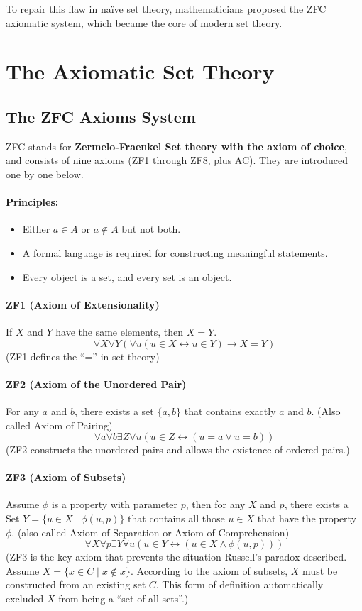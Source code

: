 To repair this flaw in naïve set theory, mathematicians proposed the ZFC axiomatic system, which became the core of modern set theory.

\section{The Axiomatic Set Theory}

\subsection{The ZFC Axioms System}
ZFC stands for \textbf{Zermelo-Fraenkel Set theory with the axiom of choice}, and consists of nine axioms (ZF1 through ZF8, plus AC). They are introduced one by one below.

\paragraph{Principles:}
\begin{itemize}
    \item Either $a \in A$ or $a \notin A$ but not both.
    \item A formal language is required for constructing meaningful statements.
    \item Every object is a set, and every set is an object.
\end{itemize}

\paragraph{ZF1 (Axiom of Extensionality)}
If $X$ and $Y$ have the same elements, then $X = Y$.
$$ \forall X \forall Y (\forall u (u \in X \leftrightarrow u \in Y) \to X = Y) $$
(ZF1 defines the “=” in set theory)

\paragraph{ZF2 (Axiom of the Unordered Pair)}
For any $a$ and $b$, there exists a set $\{a,b\}$ that contains exactly $a$ and $b$. (Also called Axiom of Pairing)
$$ \forall a \forall b \exists Z \forall u (u \in Z \leftrightarrow (u = a \vee u = b)) $$
(ZF2 constructs the unordered pairs and allows the existence of ordered pairs.)

\paragraph{ZF3 (Axiom of Subsets)}
Assume $\phi$ is a property with parameter $p$, then for any $X$ and $p$, there exists a Set $Y = \{u \in X \mid \phi(u, p)\}$ that contains all those $u \in X$ that have the property $\phi$. (also called Axiom of Separation or Axiom of Comprehension)
$$ \forall X \forall p \exists Y \forall u (u \in Y \leftrightarrow (u \in X \wedge \phi(u, p))) $$
(ZF3 is the key axiom that prevents the situation Russell’s paradox described. Assume $X = \{ x \in C \mid x \notin x \}$. According to the axiom of subsets, $X$ must be constructed from an existing set $C$. This form of definition automatically excluded $X$ from being a “set of all sets”.)

